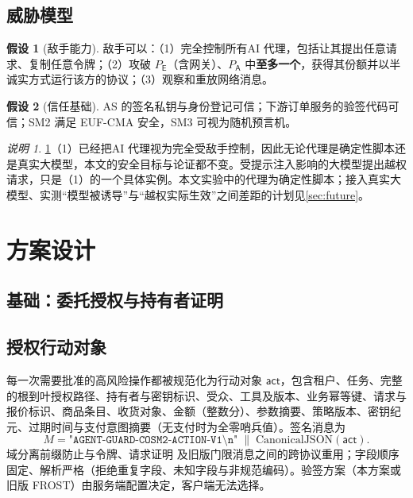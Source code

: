 \documentclass[UTF8,zihao=-4,a4paper]{ctexart}
\newif\ifshowguide
\newcommand{\guide}[1]{%
  \ifshowguide
  \begin{tcolorbox}[colback=gray!8,colframe=gray!45,boxrule=0.4pt,
      arc=1pt,left=4pt,right=4pt,top=2pt,bottom=2pt,fontupper=\small]
  \textbf{写作指引：}#1
  \end{tcolorbox}
  \fi}
\theoremstyle{plain}
\theoremstyle{definition}
\newtheorem{assumption}{假设}
\theoremstyle{remark}
\newtheorem*{remark}{说明}
\newcommand{\Pexec}{P_{\mathsf{E}}}
\newcommand{\Pauth}{P_{\mathsf{A}}}
\newcommand{\act}{\mathsf{act}}
\begin{document}
\subsection{威胁模型}
\begin{assumption}[敌手能力]\label{asm:adv}
敌手可以：（1）完全控制所有AI 代理，包括让其提出任意请求、复制任意令牌；（2）攻破 $\Pexec$（含网关）、$\Pauth$ 中\textbf{至多一个}，获得其份额并以半诚实方式运行该方的协议；（3）观察和重放网络消息。
\end{assumption}
\begin{assumption}[信任基础]\label{asm:trust}
AS 的签名私钥与身份登记可信；下游订单服务的验签代码可信；SM2 满足 EUF-CMA 安全，SM3 可视为随机预言机。
\end{assumption}
\begin{remark}
\cref{asm:adv}（1）已经把AI 代理视为完全受敌手控制，因此无论代理是确定性脚本还是真实大模型，本文的安全目标与论证都不变。受提示注入影响的大模型提出越权请求，只是（1）的一个具体实例。本文实验中的代理为确定性脚本；接入真实大模型、实测“模型被诱导”与“越权实际生效”之间差距的计划见\cref{sec:future}。
\end{remark}
\guide{必须写明不在范围内的情况：两方同时被攻破；恶意（非半诚实）参与方；侧信道（原型的标量乘不是常数时间）；同一主机、同一操作系统用户的部署（演示环境）。网关被攻破时的结论见\cref{prop:gateway}，不得扩大为“网关被攻破后任何订单都无法产生”。}

\section{方案设计}\label{sec:design}

\subsection{基础：委托授权与持有者证明}\label{sec:base}
\guide{简要介绍已有系统：授权码 + PKCE 获得根令牌；两次令牌交换，每次由 AS 签发收窄后的子令牌（金额、工具、期限、次数、深度逐维比较）；下单代理每次调用附带 请求证明，用自己的 SM2 私钥签名，并以 SM3 绑定令牌与完整请求体；网关在受理事务内复核祖先撤销状态与共享预算；执行与恢复保证同一意图只产生一次效果。控制在一页以内，并注明这部分是“基础机制”。}

\subsection{授权行动对象}
每一次需要批准的高风险操作都被规范化为行动对象 $\act$，包含租户、任务、完整的根到叶授权路径、持有者与密钥标识、受众、工具及版本、业务幂等键、请求与报价标识、商品条目、收货对象、金额（整数分）、参数摘要、策略版本、密钥纪元、过期时间与支付意图摘要（无支付时为全零哨兵值）。签名消息为
\[
M = \texttt{"AGENT-GUARD-COSM2-ACTION-V1\textbackslash n"} \;\|\; \mathrm{CanonicalJSON}(\act).
\]
域分离前缀防止与令牌、请求证明 及旧版门限消息之间的跨协议重用；字段顺序固定、解析严格（拒绝重复字段、未知字段与非规范编码）。验签方案（本方案或旧版 FROST）由服务端配置决定，客户端无法选择。
\end{document}
